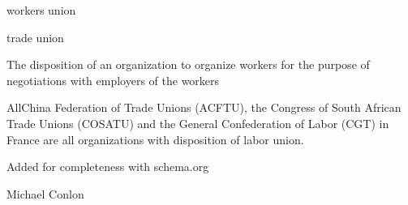 \documentclass[letterpaper,10pt,english]{sphinxmanual}
\begin{document}
\begin{sphinxShadowBox}

\sphinxAtStartPar
workers union

\sphinxAtStartPar
trade union
\end{sphinxShadowBox}

\begin{sphinxShadowBox}

\sphinxAtStartPar
{\hyperref[\detokenize{doc-BFO_0000016::doc}]{}}
\end{sphinxShadowBox}

\begin{sphinxShadowBox}

\sphinxAtStartPar
The disposition of an organization to organize workers for the purpose of negotiations with employers of the workers
\end{sphinxShadowBox}

\begin{sphinxShadowBox}

\sphinxAtStartPar
{}
\end{sphinxShadowBox}

\begin{sphinxShadowBox}

\sphinxAtStartPar
All\sphinxhyphen{}China Federation of Trade Unions (ACFTU), the Congress of South African Trade Unions (COSATU) and the General Confederation of Labor (CGT) in France are all organizations with disposition of labor union.
\end{sphinxShadowBox}

\begin{sphinxShadowBox}

\sphinxAtStartPar
Added for completeness with schema.org
\end{sphinxShadowBox}

\begin{sphinxShadowBox}

\sphinxAtStartPar
Michael Conlon 
\end{sphinxShadowBox}
\begin{quote}

\ignorespaces \end{quote}
\end{document}
